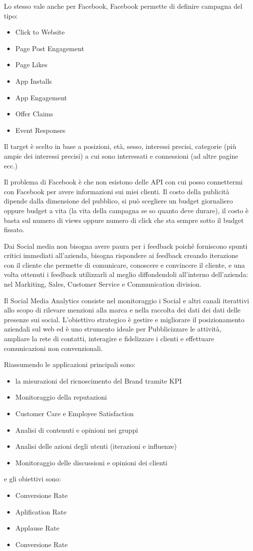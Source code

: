 \documentclass[11pt]{article}
\newenvironment{nosepitemize}{\begin{itemize}[noitemsep,topsep=0ex]}{\end{itemize}}
\begin{document}
Lo stesso vale anche per Facebook, Facebook permette di definire campagna del tipo:
\begin{nosepitemize}
	\item Click to Website
	\item Page Post Engagement
	\item Page Likes
	\item App Installs
	\item App Engagement
	\item Offer Claims
	\item Event Responses
\end{nosepitemize}
Il target è scelto in base a posizioni, età, sesso, interessi precisi, categorie (più ampie dei interessi precisi) a cui sono interessati e connessioni (ad altre pagine ecc.)

Il problema di Facebook è che non esistono delle API con cui posso connettermi con Facebook per avere informazioni sui miei clienti.
Il costo della publicità dipende dalla dimensione del pubblico, si può scegliere un budget giornaliero oppure budget a vita (la vita della campagna se so quanto deve durare), il costo è basta sul numero di views oppure numero di click che sta sempre sotto il budget fissato.

Dai Social media non bisogna avere paura per i feedback poiché forniscono spunti critici immediati all'azienda, bisogna rispondere ai feedback creando iterazione con il cliente che permette di comunicare, conoscere e convincere il cliente, e una volta ottenuti i feedback utilizzarli al meglio diffondendoli all'interno dell'azienda: nel Markiting, Sales, Customer Service e Communication division.

Il Social Media Analytics consiste nel monitoraggio i Social e altri canali iterattivi allo scopo di rilevare menzioni alla marca e nella raccolta dei dati dei dati delle presenze sui social. 
L'obiettivo strategico è gestire e migliorare il posizionamento aziendali sul web ed è uno strumento ideale per Pubblicizzare le attività, ampliare la rete di contatti, interagire e fidelizzare i clienti e effettuare comunicazioni non convenzionali.

Riassumendo le applicazioni principali sono:
\begin{nosepitemize}
	\item la misurazioni del ricnoscimento del Brand tramite KPI
	\item Monitoraggio della reputazioni
	\item Customer Care e Employee Satisfaction
	\item Analisi di contenuti e opinioni nei gruppi
	\item Analisi delle azioni degli utenti (iterazioni e influenze)
	\item Monitoraggio delle discussioni e opinioni dei clienti
\end{nosepitemize} 
e gli obiettivi sono:
\begin{nosepitemize}
	\item Conversione Rate
	\item Aplification Rate
	\item Applause Rate
	\item Conversione Rate
\end{nosepitemize}
\end{document}

